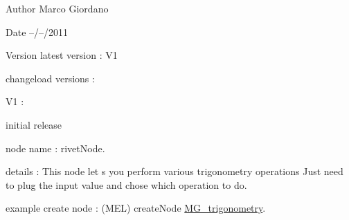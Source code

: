 \begin{DoxyAuthor}{Author}
Marco Giordano 
\end{DoxyAuthor}
\begin{DoxyDate}{Date}
--/--/2011 
\end{DoxyDate}
\begin{DoxyVersion}{Version}
latest version \-: V1 

changeload versions \-: \par
 V1 \-: \par

\begin{DoxyItemize}
\item initial release \par

\end{DoxyItemize}
\end{DoxyVersion}
node name \-: rivet\-Node.

details \-: This node let s you perform various trigonometry operations Just need to plug the input value and chose which operation to do.

example create node \-: (M\-E\-L) create\-Node \hyperlink{class_m_g__trigonometry}{M\-G\-\_\-trigonometry}. 

